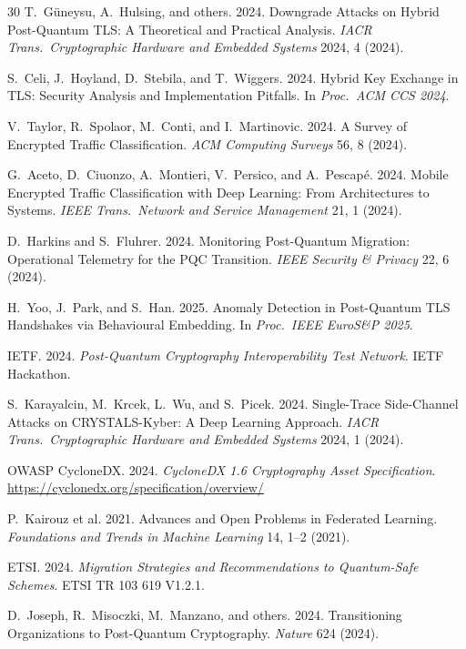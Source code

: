 \documentclass[sigconf,nonacm]{acmart}
\begin{document}
\begin{thebibliography}{30}
T.~G\"uneysu, A.~Hulsing, and others. 2024. Downgrade Attacks on
Hybrid Post-Quantum TLS: A Theoretical and Practical Analysis.
\textit{IACR Trans.\ Cryptographic Hardware and Embedded Systems}
2024, 4 (2024).

S.~Celi, J.~Hoyland, D.~Stebila, and T.~Wiggers. 2024. Hybrid
Key Exchange in TLS: Security Analysis and Implementation Pitfalls.
In \textit{Proc.\ ACM CCS 2024}.

V.~Taylor, R.~Spolaor, M.~Conti, and I.~Martinovic. 2024. A Survey of
Encrypted Traffic Classification. \textit{ACM Computing Surveys} 56,
8 (2024).

G.~Aceto, D.~Ciuonzo, A.~Montieri, V.~Persico, and A.~Pescap\'e. 2024.
Mobile Encrypted Traffic Classification with Deep Learning: From
Architectures to Systems. \textit{IEEE Trans.\ Network and Service
Management} 21, 1 (2024).

D.~Harkins and S.~Fluhrer. 2024. Monitoring Post-Quantum Migration:
Operational Telemetry for the PQC Transition.
\textit{IEEE Security \& Privacy} 22, 6 (2024).

H.~Yoo, J.~Park, and S.~Han. 2025. Anomaly Detection in Post-Quantum
TLS Handshakes via Behavioural Embedding.
In \textit{Proc.\ IEEE EuroS\&P 2025}.

IETF. 2024. \textit{Post-Quantum Cryptography Interoperability
Test Network}. IETF Hackathon.

S.~Karayalcin, M.~Krcek, L.~Wu, and S.~Picek. 2024. Single-Trace
Side-Channel Attacks on CRYSTALS-Kyber: A Deep Learning Approach.
\textit{IACR Trans.\ Cryptographic Hardware and Embedded Systems}
2024, 1 (2024).

OWASP CycloneDX. 2024. \textit{CycloneDX 1.6 Cryptography Asset
Specification}. \url{https://cyclonedx.org/specification/overview/}

P.~Kairouz et al. 2021. Advances and Open Problems in Federated
Learning. \textit{Foundations and Trends in Machine Learning} 14, 1--2
(2021).

ETSI. 2024. \textit{Migration Strategies and Recommendations to
Quantum-Safe Schemes}. ETSI TR 103 619 V1.2.1.

D.~Joseph, R.~Misoczki, M.~Manzano, and others. 2024. Transitioning
Organizations to Post-Quantum Cryptography. \textit{Nature} 624 (2024).


\end{thebibliography}
\end{document}
